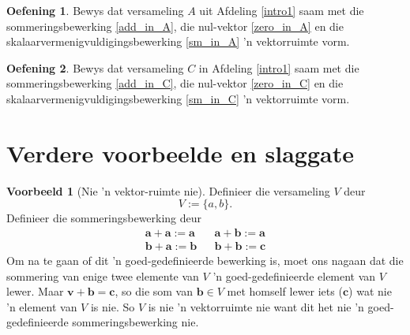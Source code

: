 \documentclass[a4paper,11pt]{book}
\theoremstyle{definition}
\newtheorem{exercise}{Oefening}
\newtheorem{example_environment}{Voorbeeld}[chapter]
\newcommand{\be}{\begin{equation}}
\newcommand{\ee}{\end{equation}}
\newcommand{\ve}[1]{\mathbf{#1}}
\newenvironment{example}
	{
		\begin{oframed}
		\begin{example_environment}
	}
	{
		\end{example_environment}
		\end{oframed}
	}
\begin{document}
\begin{exercise} Bewys dat versameling $A$ uit Afdeling \ref{intro1} saam
	met die sommeringsbewerking \eqref{add_in_A}, die nul-vektor
	\eqref{zero_in_A} en die skalaarvermenigvuldigingsbewerking
	\eqref{sm_in_A} 'n vektorruimte vorm.
\end{exercise}

\begin{exercise} Bewys dat versameling $C$ in Afdeling \ref{intro1} saam
	met die sommeringsbewerking \eqref{add_in_C}, die nul-vektor
	\eqref{zero_in_C} en die skalaarvermenigvuldigingsbewerking
	\eqref{sm_in_C} 'n vektorruimte vorm.
\end{exercise}


\section{Verdere voorbeelde en slaggate} \label{ACh1Sec4MoreExamples}

\begin{example}[Nie 'n vektor-ruimte nie] Definieer die versameling $V$
	deur
	\be
	V := \{ a, b \} .
	\ee
	Definieer die sommeringsbewerking deur
	\begin{align}
		\ve{a} + \ve{a} := \ve{a} && \ve{a} + \ve{b} := \ve{a} \\
		\ve{b} + \ve{a} := \ve{b} && \ve{b} + \ve{b} := \ve{c}
	\end{align}
	Om na te gaan of dit 'n goed-gedefinieerde bewerking is, moet ons
	nagaan dat die sommering van enige twee elemente van $V$ 'n
	goed-gedefinieerde element van $V$ lewer. Maar $\ve{v} + \ve{b} =
	\ve{c}$, so die som van $\ve{b} \in V$ met homself lewer iets
	($\ve{c}$) wat nie 'n element van $V$ is nie. So $V$ is nie 'n
	vektorruimte nie want dit het nie 'n goed-gedefinieerde
	sommeringsbewerking nie.
\end{example}
\end{document}
